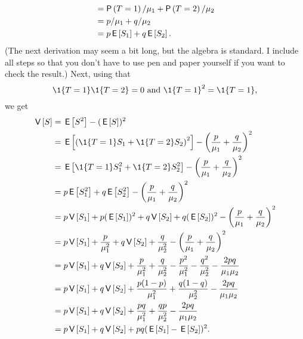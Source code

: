 \begin{extra}
\begin{solution}
\begin{align*}
&= \P{T=1} /\mu_1 + \P{T=2}/ \mu_2 \\
&= p /\mu_1 + q/ \mu_2 \\
&= p \E{S_1} + q \E{S_2}.
\end{align*}
(The next derivation may seem a bit long, but the algebra is
standard. I include all steps so that you don't have to use pen and
paper yourself if you want to check the result.) Next, using that
\begin{equation*}
\1{T=1}\1{T=2} = 0 \text{ and } \1{T=1}^2 = \1{T=1},
\end{equation*}
we get
\begin{align*}
 \V S 
&= \E{S^2} - (\E S)^2 \\
&= \E{\left(\1{T=1} S_1 + \1{T=2} S_2\right)^2} - \left(\frac{p}{\mu_1}+\frac{q}{\mu_2}\right)^2 \\
&= \E{\1{T=1} S_1^2 + \1{T=2} S_2^2} - \left(\frac{p}{\mu_1}+\frac{q}{\mu_2}\right)^2 \\ 
&= p \E{S_1^2} + q \E{S_2^2} - \left(\frac{p}{\mu_1}+\frac{q}{\mu_2}\right)^2 \\ 
&= p \V{S_1} + p (\E{S_1})^2 + q \V{S_2} + q(\E{ S_2})^2 - \left(\frac{p}{\mu_1}+\frac{q}{\mu_2}\right)^2 \\ 
&= p \V{S_1} + \frac{p}{\mu_1^2} + q \V{S_2} + \frac{q}{\mu_2^2} - \left(\frac{p}{\mu_1}+\frac{q}{\mu_2}\right)^2 \\ 
&= p \V{S_1} + q \V{S_2}
+ \frac{p}{\mu_1^2} + \frac{q}{\mu_2^2}
- \frac{p^2}{\mu_1^2}-\frac{q^2}{\mu_2^2} -\frac{2pq}{\mu_1\mu_2}\\ 
&= p \V{S_1} + q \V{S_2}
+ \frac{p(1-p)}{\mu_1^2} + \frac{q(1-q)}{\mu_2^2}
-\frac{2pq}{\mu_1\mu_2}\\ 
&= p \V{S_1} + q \V{S_2}
+ \frac{pq}{\mu_1^2} + \frac{qp}{\mu_2^2}
-\frac{2pq}{\mu_1\mu_2}\\ 
&= p \V{S_1} + q \V{S_2}
+ pq(\E{S_1} - \E{S_2})^2.
\end{align*}
\end{solution}
\end{extra}








